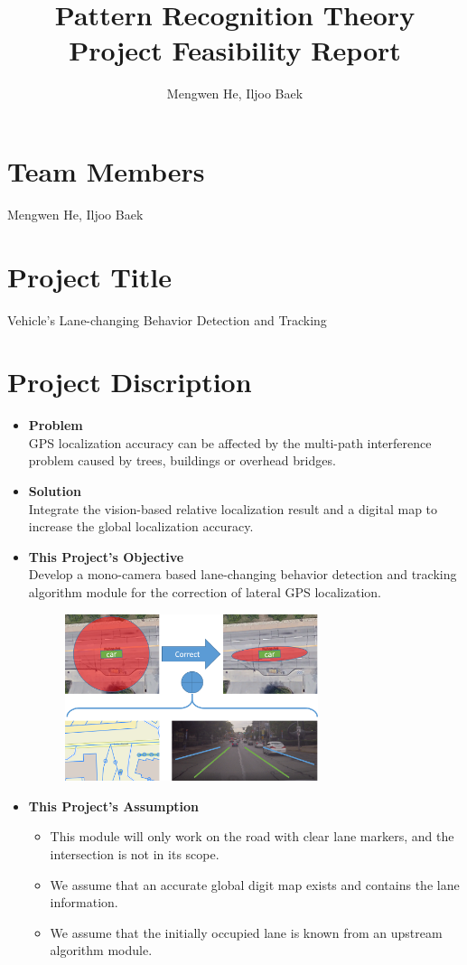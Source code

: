 \documentclass[letterpaper,11pt]{article}
\title{\textbf{Pattern Recognition Theory Project Feasibility Report}}
\author{Mengwen He, Iljoo Baek}
\begin{document}
\maketitle
	
\section{Team Members}

Mengwen He, Iljoo Baek

\section{Project Title}

Vehicle's Lane-changing Behavior Detection and Tracking

\section{Project Discription}

\begin{itemize}
	\item \textbf{Problem}\\GPS localization accuracy can be affected by the multi-path interference problem caused by trees, buildings or overhead bridges.
	\item \textbf{Solution}\\Integrate the vision-based relative localization result and a digital map to increase the global localization accuracy.
	\item \textbf{This Project's Objective}\\Develop a mono-camera based lane-changing behavior detection and tracking algorithm module for the correction of lateral GPS localization.
	\begin{figure}[!ht]
		\centering
		\includegraphics[width=0.7\textwidth]{./img/objective.png}
	\end{figure}		
	\item \textbf{This Project's Assumption}
	\begin{itemize}
		\item This module will only work on the road with clear lane markers, and the intersection is not in its scope.
		\item We assume that an accurate global digit map exists and contains the lane information.
		\item We assume that the initially occupied lane is known from an upstream algorithm module.
	\end{itemize}
\end{itemize}
\end{document}
